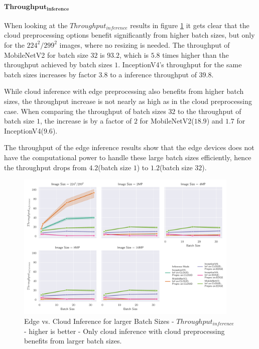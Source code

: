 \paragraph{$\mathbf{Throughput_{inference}}$}
When looking at the $Throughput_{inference}$ results in figure \ref{fig:BatchSizeInferenceThroughput} it gets clear that the cloud preprocessing options benefit significantly from higher batch sizes, but only for the $224^2/299^2$ images, where no resizing is needed.
The throughput of MobileNetV2 for batch size $32$ is $93.2$, which is $5.8$ times higher than the throughput achieved by batch sizes $1$. 
InceptionV4's throughput for the same batch sizes increases by factor $3.8$ to a inference throughput of $39.8$.

While cloud inference with edge preprocessing also benefits from higher batch sizes, the throughput increase is not nearly as high as in the cloud preprocessing case.
When comparing the throughput of batch sizes $32$ to the throughput of batch size $1$, the increase is by a factor of $2$ for MobileNetV2($18.9$) and $1.7$ for InceptionV4($9.6$).

The throughput of the edge inference results show that the edge devices does not have the computational power to handle these large batch sizes efficiently, hence the throughput drops from $4.2$(batch size $1$) to $1.2$(batch size $32$).
\begin{figure}[!htb]
\centering
\includegraphics[width=0.95\textwidth]{./Bilder/single_plots/batch_size_plots/Effects_of_Batch_size_Inference_Throughput.pdf}
\caption{Edge vs. Cloud Inference for larger Batch Sizes -  $Throughput_{inference}$ - higher is better - Only cloud inference with cloud preprocessing benefits from larger batch sizes.}
\label{fig:BatchSizeInferenceThroughput}
\end{figure}

